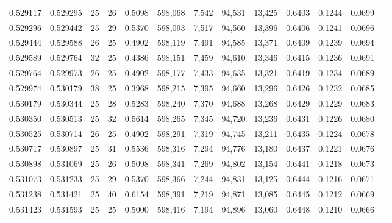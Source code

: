 \begin{tabular}{rrrrrrrrrrrrr}
0.529117 & 0.529295 &    25 &  26 &                                     0.5098 & 598,068 &   7,542 &  94,531 &  13,425 & 0.6403 & 0.1244 & 0.0699 \\
0.529296 & 0.529442 &    25 &  29 &                                     0.5370 & 598,093 &   7,517 &  94,560 &  13,396 & 0.6406 & 0.1241 & 0.0696 \\
0.529444 & 0.529588 &    26 &  25 &                                     0.4902 & 598,119 &   7,491 &  94,585 &  13,371 & 0.6409 & 0.1239 & 0.0694 \\
0.529589 & 0.529764 &    32 &  25 &                                     0.4386 & 598,151 &   7,459 &  94,610 &  13,346 & 0.6415 & 0.1236 & 0.0691 \\
0.529764 & 0.529973 &    26 &  25 &                                     0.4902 & 598,177 &   7,433 &  94,635 &  13,321 & 0.6419 & 0.1234 & 0.0689 \\
0.529974 & 0.530179 &    38 &  25 &                                     0.3968 & 598,215 &   7,395 &  94,660 &  13,296 & 0.6426 & 0.1232 & 0.0685 \\
0.530179 & 0.530344 &    25 &  28 &                                     0.5283 & 598,240 &   7,370 &  94,688 &  13,268 & 0.6429 & 0.1229 & 0.0683 \\
0.530350 & 0.530513 &    25 &  32 &                                     0.5614 & 598,265 &   7,345 &  94,720 &  13,236 & 0.6431 & 0.1226 & 0.0680 \\
0.530525 & 0.530714 &    26 &  25 &                                     0.4902 & 598,291 &   7,319 &  94,745 &  13,211 & 0.6435 & 0.1224 & 0.0678 \\
0.530717 & 0.530897 &    25 &  31 &                                     0.5536 & 598,316 &   7,294 &  94,776 &  13,180 & 0.6437 & 0.1221 & 0.0676 \\
0.530898 & 0.531069 &    25 &  26 &                                     0.5098 & 598,341 &   7,269 &  94,802 &  13,154 & 0.6441 & 0.1218 & 0.0673 \\
0.531073 & 0.531233 &    25 &  29 &                                     0.5370 & 598,366 &   7,244 &  94,831 &  13,125 & 0.6444 & 0.1216 & 0.0671 \\
0.531238 & 0.531421 &    25 &  40 &                                     0.6154 & 598,391 &   7,219 &  94,871 &  13,085 & 0.6445 & 0.1212 & 0.0669 \\
0.531423 & 0.531593 &    25 &  25 &                                     0.5000 & 598,416 &   7,194 &  94,896 &  13,060 & 0.6448 & 0.1210 & 0.0666 \\

\end{tabular}
